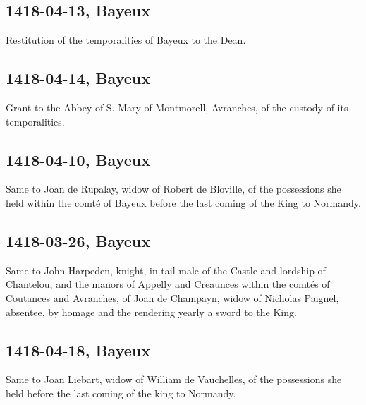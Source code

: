 \documentclass[a4paper,12pt,twoside]{book}
\begin{document}
            \subsection{1418-04-13, Bayeux}
            
                     Restitution of the temporalities of Bayeux to the Dean.
                  
            \subsection{1418-04-14, Bayeux}
            
                     Grant to the Abbey of S. Mary of Montmorell, Avranches, of the custody of its temporalities.
                  
            \subsection{1418-04-10, Bayeux}
            
                     Same to Joan de Rupalay, widow of Robert de Bloville, of the possessions she held within the comté of Bayeux before the last coming of the King to Normandy.
                  
            \subsection{1418-03-26, Bayeux}
            
                     Same to John Harpeden, knight, in tail male of the Castle and lordship of Chantelou, and the manors of Appelly and Creaunces within the comtés of Coutances and Avranches, of Joan de Champayn, widow of Nicholas Paignel, absentee, by homage and the rendering yearly a sword to the King.
                  
            \subsection{1418-04-18, Bayeux}
            
                     Same to Joan Liebart, widow of William de Vauchelles, of the possessions she held before the last coming of the king to Normandy.
                  
\end{document}
